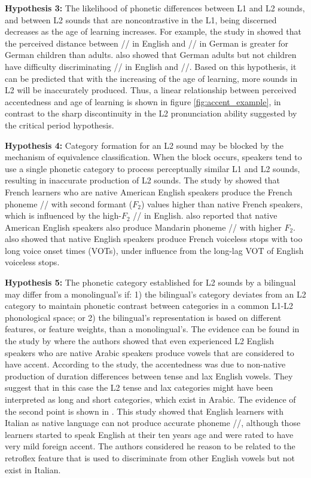 \textbf{Hypothesis 3:} The likelihood of phonetic differences between L1 and L2 sounds, and between L2 sounds that are noncontrastive in the L1, being discerned decreases as the age of learning increases. For example, the study in \citep{butcher1978influence} showed that the perceived distance between // in English and /\textepsilon/ in German is greater for German children than adults. \cite{weiher1975lautwahrnehmung} also showed that German adults but not children have difficulty discriminating // in English and /\textepsilon/. Based on this hypothesis, it can be predicted that with the increasing of the age of learning, more sounds in L2 will be inaccurately produced. Thus, a linear relationship between perceived accentedness and age of learning is shown in figure \ref{fig:accent_example}, in contrast to the sharp discontinuity in the L2 pronunciation ability suggested by the critical period hypothesis.

\textbf{Hypothesis 4:} Category formation for an L2 sound may be blocked by the mechanism of equivalence classification. When the block occurs, speakers tend to use a single phonetic category to process perceptually similar L1 and L2 sounds, resulting in inaccurate production of L2 sounds. The study by \cite{flege1987production} showed that French learners who are native American English speakers produce the French phoneme // with second formant ($F_2$) values higher than native French speakers, which is influenced by the high-$F_2$ // in English. \cite{chang2008phonetic} also reported that native American English speakers also produce Mandarin phoneme // with higher $F_2$. \cite{flege1987production} also showed that native English speakers produce French voiceless stops with too long voice onset times (VOTs), under influence from the long-lag VOT of English voiceless stops.

\textbf{Hypothesis 5:} The phonetic category established for L2 sounds by a bilingual may differ from a monolingual's if: 1) the bilingual's category deviates from an L2 category to maintain phonetic contrast between categories in a common L1-L2 phonological space; or 2) the bilingual's representation is based on different features, or feature weights, than a monolingual's. The evidence can be found in the study by \cite{munro1993productions} where the authors showed that even experienced L2 English speakers who are native Arabic speakers produce vowels that are considered to have accent. According to the study, the accentedness was due to non-native production of duration differences between tense and lax English vowels. They suggest that in this case the L2 tense and lax categories might have been interpreted as long and short categories, which exist in Arabic. The evidence of the second point is shown in \citep{munro1996effects}. This study showed that English learners with Italian as native language can not produce accurate phoneme /\textrhookschwa/, although those learners started to speak English at their ten years age and were rated to have very mild foreign accent. The authors considered he reason to be related to the retroflex feature that is used to discriminate from other English vowels but not exist in Italian.

